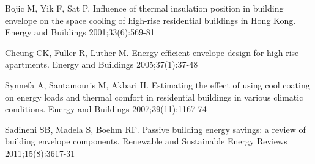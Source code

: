 \begin{thebibliography}{9}
      Bojic M, Yik F, Sat P. 
      Influence of thermal insulation position in building envelope on the space cooling of high-rise 
      residential buildings in Hong Kong.
      Energy and Buildings 2001;33(6):569-81
      
      Cheung CK, Fuller R, Luther M.
      Energy-efficient envelope design for high rise apartments.
      Energy and Buildings 2005;37(1):37-48

      Synnefa A, Santamouris M, Akbari H. 
      Estimating the effect of using cool coating on energy loads and thermal comfort in residential 
      buildings in various climatic conditions. 
      Energy and Buildings 2007;39(11):1167-74

      Sadineni SB, Madela S, Boehm RF. 
      Passive building energy savings: a review of building envelope components.
      Renewable and Sustainable Energy Reviews 2011;15(8):3617-31
\end{thebibliography}
